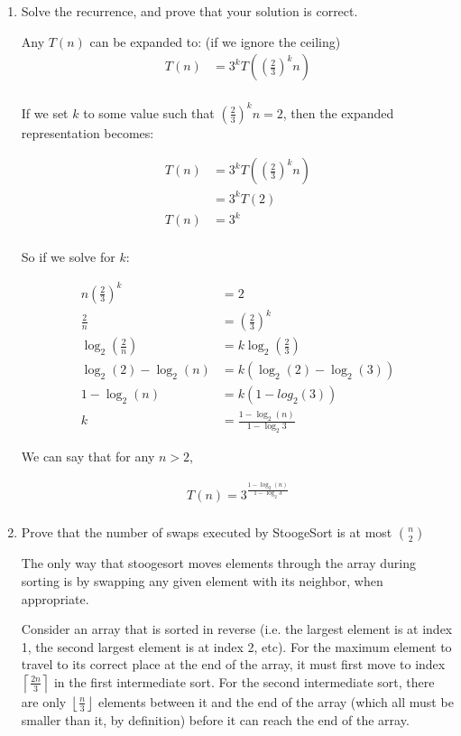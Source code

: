 \documentclass{article}
\newcommand{\ceil}[1]{\left\lceil#1\right\rceil}
\newcommand{\floor}[1]{\left\lfloor#1\right\rfloor}
\newcommand{\question}[1]{\bgroup\color{blue}#1\egroup}
\begin{document}
\begin{enumerate}
\begin{enumerate}
    \item 
      \question{Solve the recurrence, and prove that your solution is correct. }

    Any $T(n)$ can be expanded to: (if we ignore the ceiling)
    \begin{align*}
      T(n) &= 3^k T\left(\left(\frac{2}{3}\right)^k n\right)\\
    \end{align*}

    If we set $k$ to some value such that $\left(\frac{2}{3}\right)^k n = 2$, then the expanded representation becomes:

    \begin{align*}
      T(n) &= 3^k T\left(\left(\frac{2}{3}\right)^k n\right)\\
      &= 3^k T(2)\\
      T(n) &= 3^k\\
    \end{align*}

    So if we solve for $k$:
    
    \begin{align*}
      n \left(\frac{2}{3}\right)^k &= 2\\
      \frac{2}{n} &= \left(\frac{2}{3}\right)^k\\
      \log_2\left(\frac{2}{n}\right) &= k \log_2\left(\frac{2}{3}\right)\\
      \log_2(2) - \log_2(n) &= k\left(\log_2(2) - \log_2(3)\right)\\
      1 - \log_2(n) &= k\left(1 - log_2(3)\right)\\
      k &= \frac{1 - \log_2(n)}{1 - \log_2{3}}
    \end{align*}

    We can say that for any $n > 2$,

    \begin{align*}
      T(n) = 3^{\frac{1 - \log_2(n)}{1 - \log_2{3}}}\\
    \end{align*}

    \item
      \question{Prove that the number of swaps executed by StoogeSort is at most $n \choose 2$}

      The only way that stoogesort moves elements through the array during sorting is by swapping any given element with its neighbor, when appropriate.

      Consider an array that is sorted in reverse (i.e. the largest element is at index 1, the second largest element is at index 2, etc). For the maximum element to travel to its correct place at the end of the array, it must first move to index $\ceil{\frac{2n}{3}}$ in the first intermediate sort. 
      For the second intermediate sort, there are only $\floor{\frac{n}{3}}$ elements between it and the end of the array (which all must be smaller than it, by definition) before it can reach the end of the array.
      

\end{enumerate}
\end{enumerate}
\end{document}

